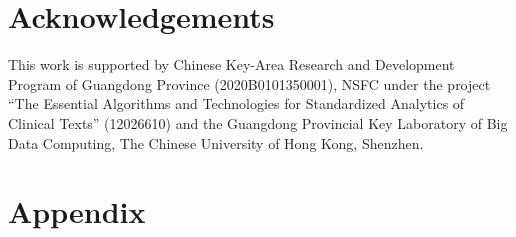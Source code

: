 \documentclass[11pt]{article}
\begin{document}
\section*{Acknowledgements}
This work is supported by Chinese Key-Area Research and Development Program of Guangdong Province (2020B0101350001), NSFC under the project “The Essential Algorithms and Technologies for Standardized Analytics of Clinical Texts” (12026610) and the Guangdong Provincial Key Laboratory of Big Data Computing, The Chinese University of Hong Kong, Shenzhen.




\clearpage
\appendix
\section{Appendix}
\label{sec:appendix}

\end{document}
